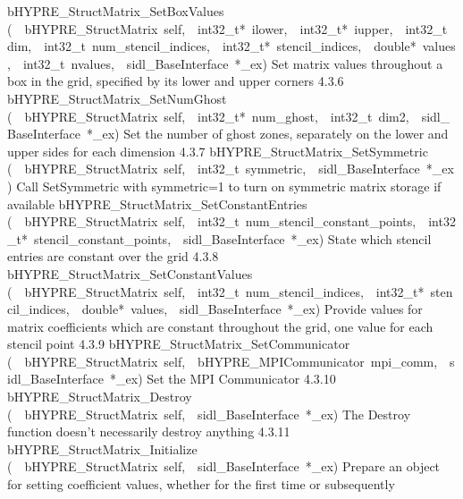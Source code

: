 \documentclass{article}
\begin{document}
\begin{cxxentry}
\begin{cxxentry}
\begin{cxxnames}
        {bHYPRE\_StructMatrix\_SetBoxValues}
        {(\ \ bHYPRE\_StructMatrix\ self,\ \ int32\_t*\ ilower,\ \ int32\_t*\ iupper,\ \ int32\_t\ dim,\ \ int32\_t\ num\_stencil\_indices,\ \ int32\_t*\ stencil\_indices,\ \ double*\ values,\ \ int32\_t\ nvalues,\ \ sidl\_BaseInterface\ *\_ex)}
        {
Set matrix values throughout a box in the grid, specified by its lower
and upper corners}
        {4.3.6}
        {bHYPRE\_StructMatrix\_SetNumGhost}
        {(\ \ bHYPRE\_StructMatrix\ self,\ \ int32\_t*\ num\_ghost,\ \ int32\_t\ dim2,\ \ sidl\_BaseInterface\ *\_ex)}
        {
Set the number of ghost zones, separately on the lower and upper sides
for each dimension}
        {4.3.7}
        {bHYPRE\_StructMatrix\_SetSymmetric}
        {(\ \ bHYPRE\_StructMatrix\ self,\ \ int32\_t\ symmetric,\ \ sidl\_BaseInterface\ *\_ex)}
        {
Call SetSymmetric with symmetric=1 to turn on symmetric matrix storage if
available}
        {}
\label{cxx.4.3.18}
        {bHYPRE\_StructMatrix\_SetConstantEntries}
        {(\ \ bHYPRE\_StructMatrix\ self,\ \ int32\_t\ num\_stencil\_constant\_points,\ \ int32\_t*\ stencil\_constant\_points,\ \ sidl\_BaseInterface\ *\_ex)}
        {
State which stencil entries are constant over the grid}
        {4.3.8}
        {bHYPRE\_StructMatrix\_SetConstantValues}
        {(\ \ bHYPRE\_StructMatrix\ self,\ \ int32\_t\ num\_stencil\_indices,\ \ int32\_t*\ stencil\_indices,\ \ double*\ values,\ \ sidl\_BaseInterface\ *\_ex)}
        {
Provide values for matrix coefficients which are constant throughout
the grid, one value for each stencil point}
        {4.3.9}
        {bHYPRE\_StructMatrix\_SetCommunicator}
        {(\ \ bHYPRE\_StructMatrix\ self,\ \ bHYPRE\_MPICommunicator\ mpi\_comm,\ \ sidl\_BaseInterface\ *\_ex)}
        {
Set the MPI Communicator}
        {4.3.10}
        {bHYPRE\_StructMatrix\_Destroy}
        {(\ \ bHYPRE\_StructMatrix\ self,\ \ sidl\_BaseInterface\ *\_ex)}
        {
The Destroy function doesn't necessarily destroy anything}
        {4.3.11}
        {bHYPRE\_StructMatrix\_Initialize}
        {(\ \ bHYPRE\_StructMatrix\ self,\ \ sidl\_BaseInterface\ *\_ex)}
        {
Prepare an object for setting coefficient values, whether for
the first time or subsequently}
        {}
\label{cxx.4.3.19}

\end{cxxnames}
\end{cxxentry}
\end{cxxentry}
\end{document}
